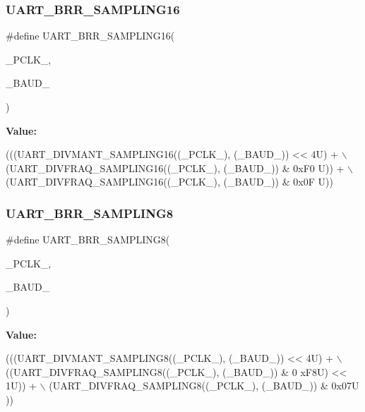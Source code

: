 \subsubsection{\texorpdfstring{U\+A\+R\+T\+\_\+\+B\+R\+R\+\_\+\+S\+A\+M\+P\+L\+I\+N\+G16}{UART\_BRR\_SAMPLING16}}
{\footnotesize\ttfamily \#define U\+A\+R\+T\+\_\+\+B\+R\+R\+\_\+\+S\+A\+M\+P\+L\+I\+N\+G16(\begin{DoxyParamCaption}\item[{}]{\+\_\+\+P\+C\+L\+K\+\_\+,  }\item[{}]{\+\_\+\+B\+A\+U\+D\+\_\+ }\end{DoxyParamCaption})}

{\bfseries Value\+:}
\begin{DoxyCode}
(((UART\_DIVMANT\_SAMPLING16((\_PCLK\_), (\_BAUD\_)) << 4U) + \(\backslash\)
                                                        (UART\_DIVFRAQ\_SAMPLING16((\_PCLK\_), (\_BAUD\_)) & 0xF0
      U)) + \(\backslash\)
                                                        (UART\_DIVFRAQ\_SAMPLING16((\_PCLK\_), (\_BAUD\_)) & 0x0F
      U))
\end{DoxyCode}
\mbox{\label{group___u_a_r_t___private___macros_gae36ed9e94681494a31a9d8a7bbcc1a2c}} 
\subsubsection{\texorpdfstring{U\+A\+R\+T\+\_\+\+B\+R\+R\+\_\+\+S\+A\+M\+P\+L\+I\+N\+G8}{UART\_BRR\_SAMPLING8}}
{\footnotesize\ttfamily \#define U\+A\+R\+T\+\_\+\+B\+R\+R\+\_\+\+S\+A\+M\+P\+L\+I\+N\+G8(\begin{DoxyParamCaption}\item[{}]{\+\_\+\+P\+C\+L\+K\+\_\+,  }\item[{}]{\+\_\+\+B\+A\+U\+D\+\_\+ }\end{DoxyParamCaption})}

{\bfseries Value\+:}
\begin{DoxyCode}
(((UART\_DIVMANT\_SAMPLING8((\_PCLK\_), (\_BAUD\_)) << 4U) + \(\backslash\)
                                                        ((UART\_DIVFRAQ\_SAMPLING8((\_PCLK\_), (\_BAUD\_)) & 0
      xF8U) << 1U)) + \(\backslash\)
                                                        (UART\_DIVFRAQ\_SAMPLING8((\_PCLK\_), (\_BAUD\_)) & 0x07U
      ))
\end{DoxyCode}
